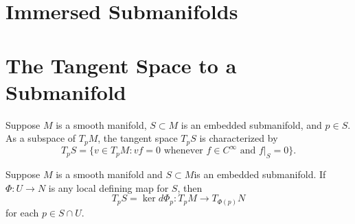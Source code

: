 \section{Immersed Submanifolds}

\section{The Tangent Space to a Submanifold}
\begin{proposition}[characerization of $T_pS$]
    Suppose $M$ is a smooth manifold, $S \subset M$ is an embedded submanifold, and $p \in S$. As a subspace of $T_pM$, the tangent space $T_pS$ is characterized by 
    $$T_pS = \{v \in T_pM : vf = 0 \text{ whenever }f \in C^\infty \text{ and }f|_S=0\}. $$
\end{proposition}
\begin{proposition}
    Suppose $M$ is a smooth manifold and $S \subset M$is an embedded submanifold. If $\Phi:U \to N$ is any local defining map for $S$, then 
    $$ T_pS = \ker d\Phi_p:T_pM \to T_{\Phi(p)}N $$
    for each $p \in S \cap U$. 
\end{proposition}
